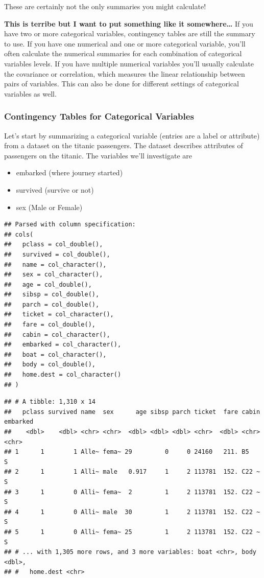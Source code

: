 \documentclass[
]{book}
\providecommand{\tightlist}{%
  \setlength{\itemsep}{0pt}\setlength{\parskip}{0pt}}
\theoremstyle{definition}
\theoremstyle{definition}
\theoremstyle{definition}
\theoremstyle{remark}
\begin{document}
These are certainly not the only summaries you might calculate!

\textbf{This is terribe but I want to put something like it somewhere\ldots{}} If you have two or more categorical variables, contingency tables are still the summary to use. If you have one numerical and one or more categorical variable, you'll often calculate the numerical summaries for each combination of categorical variables levels. If you have multiple numerical variables you'll usually calculate the covariance or correlation, which measures the linear relationship between pairs of variables. This can also be done for different settings of categorical variables as well.

\hypertarget{contingency-tables-for-categorical-variables}{%
\subsubsection{Contingency Tables for Categorical Variables}\label{contingency-tables-for-categorical-variables}}

Let's start by summarizing a categorical variable (entries are a label or attribute) from a dataset on the titanic passengers. The dataset describes attributes of passengers on the titanic. The variables we'll investigate are

\begin{itemize}
\tightlist
\item
  embarked (where journey started)\\
\item
  survived (survive or not)\\
\item
  sex (Male or Female)
\end{itemize}

\begin{verbatim}
## Parsed with column specification:
## cols(
##   pclass = col_double(),
##   survived = col_double(),
##   name = col_character(),
##   sex = col_character(),
##   age = col_double(),
##   sibsp = col_double(),
##   parch = col_double(),
##   ticket = col_character(),
##   fare = col_double(),
##   cabin = col_character(),
##   embarked = col_character(),
##   boat = col_character(),
##   body = col_double(),
##   home.dest = col_character()
## )
\end{verbatim}

\begin{verbatim}
## # A tibble: 1,310 x 14
##   pclass survived name  sex      age sibsp parch ticket  fare cabin embarked
##    <dbl>    <dbl> <chr> <chr>  <dbl> <dbl> <dbl> <chr>  <dbl> <chr> <chr>   
## 1      1        1 Alle~ fema~ 29         0     0 24160   211. B5    S       
## 2      1        1 Alli~ male   0.917     1     2 113781  152. C22 ~ S       
## 3      1        0 Alli~ fema~  2         1     2 113781  152. C22 ~ S       
## 4      1        0 Alli~ male  30         1     2 113781  152. C22 ~ S       
## 5      1        0 Alli~ fema~ 25         1     2 113781  152. C22 ~ S       
## # ... with 1,305 more rows, and 3 more variables: boat <chr>, body <dbl>,
## #   home.dest <chr>
\end{verbatim}
\end{document}
